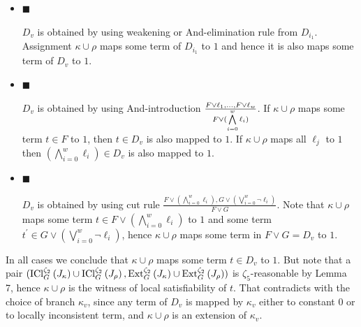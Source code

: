 \begin{itemize}


\item[] 
$\blacksquare$ 


$D_{v}$ is obtained by using weakening or And-elimination rule from $D_{i_{1}}$. Assignment
$\kappa\cup\rho$ maps some term of $D_{i_{1}}$ to $1$ and hence it is also maps some term of
$D_{v}$ to $1$.\par





\item[] 
$\blacksquare$ 


$D_{v}$ is obtained by using And-introduction $\frac{F\vee\ell_{1},\dots,F\vee\ell_{w}}{F\vee(\bigwedge\limits_{i=0}^{w}\ell_%
{i})}$. If $\kappa\cup\rho$ maps some term $t\in F$ to
$1$, then $t\in D_{v}$ is also mapped to $1$. If $\kappa\cup\rho$ maps all $\ell_{j}$ to $1$
then $(\bigwedge\limits_{i=0}^{w}\ell_{i})\in D_{v}$ is also mapped to $1$.\par





\item[] 
$\blacksquare$ 


$D_{v}$ is obtained by using cut rule $\frac{F\vee(\bigwedge\limits_{i=0}^{w}\ell_{i}),G\vee(\bigvee\limits_{i=0}^{w}%
\neg\ell_{i})}{F\vee G}$. Note that $\kappa\cup\rho$ maps some
term $t\in F\vee(\bigwedge\limits_{i=0}^{w}\ell_{i})$ to $1$ and some term $t^{\prime}\in G\vee(\bigvee\limits_{i=0}^{w}\neg\ell_{i})$, hence $\kappa\cup\rho$ maps some term in $F\vee G=D_{v}$ to $1$.\par





\end{itemize}


In all cases we conclude that $\kappa\cup\rho$ maps some term $t\in D_{v}$ to $1$. But note that a pair
$(\mathrm{ICl}_{G}^{\zeta_{2}}\left(J_{\kappa}\right)\cup\mathrm{ICl}_{G}^{%
\zeta_{2}}\left(J_{\rho}\right),\mathrm{Ext}_{G}^{\zeta_{2}}\left(J_{\kappa}%
\right)\cup\mathrm{Ext}_{G}^{\zeta_{2}}\left(J_{\rho}\right))$ is $\zeta_{5}$-reasonable by Lemma 7, hence $\kappa\cup\rho$ is the witness of local satisfiability of $t$. That contradicts with the choice of branch
$\kappa_{v}$, since any term of $D_{v}$ is mapped by $\kappa_{v}$ either to constant $0$ or to locally
inconsistent term, and $\kappa\cup\rho$ is an extension of $\kappa_{v}$.\par





